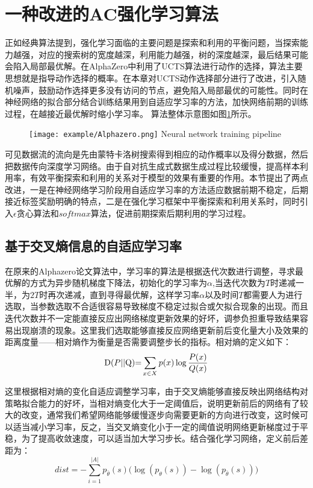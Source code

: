 \section{一种改进的AC强化学习算法}
正如经典算法提到，强化学习面临的主要问题是探索和利用的平衡问题，当探索能力越强，对应的搜索树的宽度越深，利用能力越强，树的深度越深，最后结果可能会陷入局部最优解。在AlphaZero中利用了UCTS算法进行动作的选择，算法主要思想就是指导动作选择的概率。在本章对UCTS动作选择部分进行了改进，引入随机噪声，鼓励动作选择更多没有访问的节点，避免陷入局部最优的可能性。同时在神经网络的拟合部分结合训练结果用到自适应学习率的方法，加快网络前期的训练过程，在越接近最优解时缩小学习率。
算法整体示意图如图\ref{fig:ACgaijin}所示。
\begin{figure}[!htp]
	\centering
	\texttt{[image: example/Alphazero.png]}
	{Neural network training pipeline}
	\label{fig:ACgaijin}
\end{figure}
可见数据流的流向是先由蒙特卡洛树搜索得到相应的动作概率以及得分数据，然后把数据传向深度学习网络。由于自对抗生成式数据生成过程比较缓慢，提高样本利用率，有效平衡探索和利用的关系对于模型的效果有重要的作用。本节提出了两点改进，一是在神经网络学习阶段用自适应学习率的方法适应数据前期不稳定，后期接近标签奖励明确的特点，二是在强化学习框架中平衡探索和利用关系时，同时引入$\epsilon$贪心算法和$softmax$算法，促进前期探索后期利用的学习过程。
\subsection{基于交叉熵信息的自适应学习率}
在原来的Alphazero论文算法中，学习率的算法是根据迭代次数进行调整，寻求最优解的方式为异步随机梯度下降法，初始化的学习率为$\alpha$,当迭代次数为$T$时递减一半，为$2T$时再次递减，直到寻得最优解，这样学习率$\alpha$以及时间$T$都需要人为进行选取，当参数选取不合适很容易导致梯度不稳定过拟合或欠拟合现象的出现。而且迭代次数并不一定能直接反应出网络梯度更新效果的好坏，调参负担重导致结果容易出现崩溃的现象。这里我们选取能够直接反应网络更新前后变化量大小及效果的距离度量——相对熵作为衡量是否需要调整步长的指标。相对熵的定义如下：
\begin{equation}
{\rm{D}}(P{\rm{||Q}}){\rm{ = }}\sum\limits_{x \in X} {p(x)\log \frac{{P(x)}}{{Q(x)}}} 
\end{equation}

这里根据相对熵的变化自适应调整学习率，由于交叉熵能够直接反映出网络结构对策略拟合能力的好坏，当相对熵变化大于一定阈值后，说明更新前后的网络有了较大的改变，通常我们希望网络能够缓慢逐步向需要更新的方向进行改变，这时候可以适当减小学习率，反之，当交叉熵变化小于一定的阈值说明网络更新梯度过于平稳，为了提高收敛速度，可以适当加大学习步长。结合强化学习网络，定义前后差距为：
\begin{equation}
\label{eq:dist}
dist =  - \sum\limits_{i = 1}^{|A|} {{p_{\bar \theta }}(s)(\log ({p_\theta }(s)) - \log ({p_{\bar \theta }}(s))} )
\end{equation}

